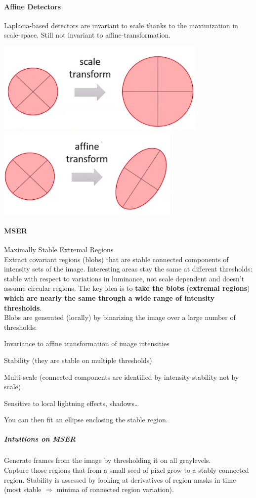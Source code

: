 \documentclass[10pt]{report}
\begin{document}
\paragraph{Affine Detectors} Laplacia-based detectors are invariant to scale thanks to the maximization in scale-space. Still not invariant to affine-transformation.
\begin{center}
	\includegraphics[scale=0.5]{7.png}\\
	\includegraphics[scale=0.5]{8.png}
\end{center}
\paragraph{MSER} Maximally Stable Extremal Regions\\
Extract covariant regions (blobs) that are stable connected components of intensity sets of the image. Interesting areas stay the same at different thresholds: stable with respect to variations in luminance, not scale dependent and doesn't assume circular regions. The key idea is to \textbf{take the blobs} (\textbf{extremal regions}) \textbf{which are nearly the same through a wide range of intensity thresholds}.\\
Blobs are generated (locally) by binarizing the image over a large number of thresholds:\begin{list}{}{}
	\item Invariance to affine transformation of image intensities
	\item Stability (they are stable on multiple thresholds)
	\item Multi-scale (connected components are identified by intensity stability not by scale)
	\item Sensitive to local lightning effects, shadows\ldots
\end{list}
You can then fit an ellipse enclosing the stable region.
\subparagraph{Intuitions on MSER} Generate frames from the image by thresholding it on all graylevels.\\
Capture those regions that from a small seed of pixel grow to a stably connected region. Stability is assessed by looking at derivatives of region masks in time (most stable $\Rightarrow$ minima of connected region variation).
\end{document}
